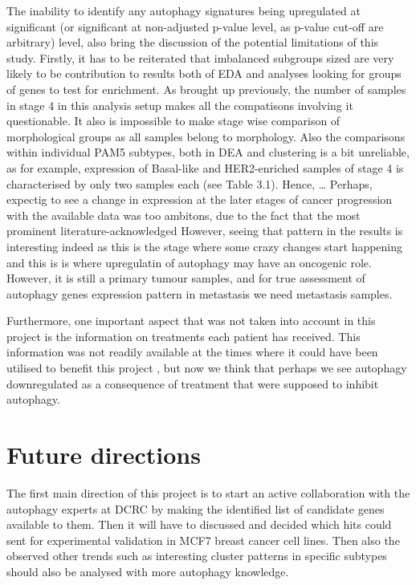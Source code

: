 The inability to identify any autophagy signatures being upregulated at significant (or significant at non-adjusted p-value level, as p-value cut-off are arbitrary) level, also bring the discussion of the potential limitations of this study. Firstly, it has to be reiterated that imbalanced subgroups sized are very likely to be contribution to results both of EDA and analyses looking for groups of genes to test for enrichment. As brought up previously, the number of samples in stage 4 in this analysis setup makes all the compatisons involving it questionable. It also is impossible to make stage wise comparison of morphological groups as all samples belong to morphology. Also the comparisons within individual PAM5 subtypes, both in DEA and clustering is a bit unreliable, as for example, expression of Basal-like and HER2-enriched samples of stage 4 is characterised by only two samples each (see Table 3.1). Hence, … Perhaps, expectig to see a change in expression at the later stages of cancer progression with the available data was too ambitons, due to the fact that the most prominent literature-acknowledged   However, seeing that pattern in the results is interesting indeed as this is the stage where some crazy changes start happening and this is is where upregulatin of autophagy may have an oncogenic role. However, it is still a primary tumour samples, and for true assessment of autophagy genes expression pattern in metastasis we need metastasis samples.  

Furthermore, one important aspect that was not taken into account in this project is the information on treatments each patient has received. This information was not readily available at the times where it could have been utilised to benefit this project , but now we think that perhaps we see autophagy downregulated as a consequence of treatment that were supposed to inhibit autophagy. 




\section{Future directions}



The first main direction of this project is to start an active collaboration with the autophagy experts at DCRC by making the identified list of candidate genes available to them. Then it will have to discussed and decided which hits could sent for experimental validation in MCF7 breast cancer cell lines. 
Then also the observed other trends such as interesting cluster patterns in specific subtypes should also be analysed with more autophagy knowledge. 

